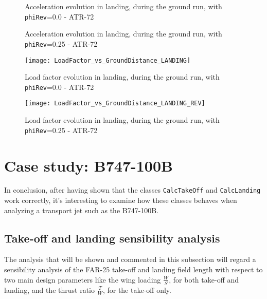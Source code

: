 %
\begin{figure}[!t]
\centering

\caption{Acceleration evolution in landing, during the ground run, with \lstinline[language=Java]!phiRev!=0.0 - ATR-72}
\end{figure}
%
\begin{figure}[!b]
\centering

\caption{Acceleration evolution in landing, during the ground run, with \lstinline[language=Java]!phiRev!=0.25 - ATR-72}
\end{figure}
%
\begin{figure}[!b]
\centering
\texttt{[image: LoadFactor\_vs\_GroundDistance\_LANDING]}
\caption{Load factor evolution in landing, during the ground run, with \lstinline[language=Java]!phiRev!=0.0 - ATR-72}
\end{figure}
%
\begin{figure}[!b]
\centering
\texttt{[image: LoadFactor\_vs\_GroundDistance\_LANDING\_REV]}
\caption{Load factor evolution in landing, during the ground run, with \lstinline[language=Java]!phiRev!=0.25 - ATR-72}
\label{fig:LandingEnd}
\end{figure}
%
%
\clearpage
%
\section{Case study: B747-100B}
%
In conclusion, after having shown that the classes \lstinline[language=Java]!CalcTakeOff! and \lstinline[language=Java]!CalcLanding! work correctly, it's interesting to examine how these classes behaves when analyzing a transport jet such as the B747-100B. 
%
\subsection{Take-off and landing sensibility analysis}
The analysis that will be shown and commented in this subsection will regard a sensibility analysis of the \gls{FAR}-25 take-off and landing field length with respect to two main design parameters like the wing loading $\frac{W}{S}$, for both take-off and landing, and the thrust ratio $\frac{T}{W}$, for the take-off only.

